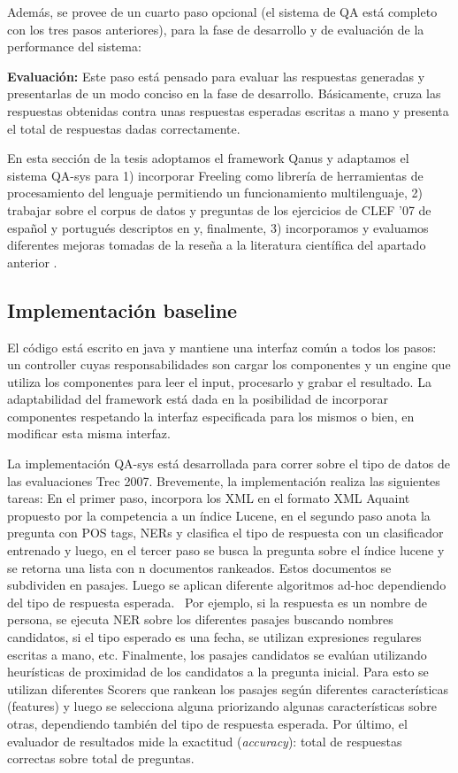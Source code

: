 Además, se provee de un cuarto paso opcional (el sistema de QA está
completo con los tres pasos anteriores), para la fase de desarrollo y
de evaluación de la performance del sistema:\newline


\textbf{Evaluación: }Este paso está pensado para evaluar las respuestas generadas y
presentarlas de un modo conciso en la fase de desarrollo.
Básicamente, cruza las respuestas obtenidas contra unas respuestas
esperadas escritas a mano y presenta el total de respuestas dadas
correctamente.\newline

En esta sección de la tesis adoptamos el framework Qanus y adaptamos el sistema QA-sys para 1) incorporar Freeling como librería de herramientas de procesamiento del lenguaje permitiendo un funcionamiento multilenguaje, 2) trabajar sobre el corpus de datos y preguntas de los ejercicios de CLEF '07 de español y portugués descriptos en  y, finalmente, 3) incorporamos y evaluamos diferentes mejoras tomadas de la reseña a la literatura científica del apartado anterior .

\subsection{Implementación baseline}
\label{subsec:baseline}
El código está escrito en java y mantiene una interfaz común a
todos los pasos: un controller cuyas responsabilidades son cargar los
componentes y un engine que utiliza los componentes para leer el input,
procesarlo y grabar el resultado. La adaptabilidad del framework está
dada en la posibilidad de incorporar componentes respetando la interfaz
especificada para los mismos o bien, en modificar esta misma interfaz.

La implementación QA-sys está desarrollada para correr sobre
el tipo de datos de las evaluaciones Trec 2007.
Brevemente, la implementación realiza las siguientes tareas:
En el primer paso, incorpora los XML en el formato XML Aquaint propuesto por la competencia a un índice Lucene, en
el segundo paso anota la pregunta con POS tags, NERs y
clasifica el tipo de respuesta con un clasificador entrenado y luego,
en el tercer paso se busca la pregunta sobre el índice lucene y se
retorna una lista con n documentos rankeados. Estos documentos se
subdividen en pasajes. Luego se aplican diferente algoritmos ad-hoc
dependiendo del tipo de respuesta esperada. \ Por ejemplo, si la
respuesta es un nombre de persona, se ejecuta NER sobre los diferentes
pasajes buscando nombres candidatos, si el tipo esperado es una fecha,
se utilizan expresiones regulares escritas a mano, etc. Finalmente, los
pasajes candidatos se evalúan utilizando heurísticas de proximidad
de los candidatos a la pregunta inicial. Para esto se utilizan
diferentes Scorers que rankean los pasajes según diferentes
características (features) y luego se selecciona alguna priorizando
algunas características sobre otras, dependiendo también del tipo
de respuesta esperada. Por último, el evaluador de resultados mide la
exactitud (\textit{accuracy}): total de respuestas correctas sobre
total de preguntas.

